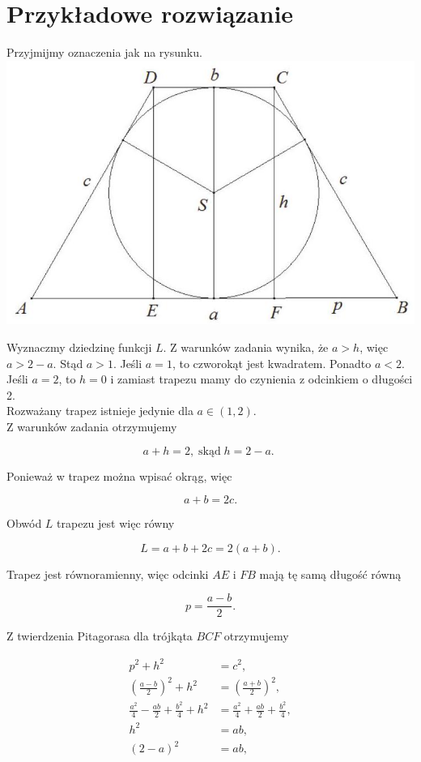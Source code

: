 \documentclass[10pt]{article}
\begin{document}
\section*{Przykładowe rozwiązanie}
Przyjmijmy oznaczenia jak na rysunku.\\
\includegraphics[max width=\textwidth, center]{2025_02_07_a13180f11f288af0ed0dg-31}

Wyznaczmy dziedzinę funkcji $L$. Z warunków zadania wynika, że $a>h$, więc $a>2-a$. Stąd $a>1$. Jeśli $a=1$, to czworokąt jest kwadratem. Ponadto $a<2$. Jeśli $a=2$, to $h=0$ i zamiast trapezu mamy do czynienia z odcinkiem o długości 2.\\
Rozważany trapez istnieje jedynie dla $a \in(1,2)$.\\
Z warunków zadania otrzymujemy

$$
a+h=2, \operatorname{skąd} h=2-a \text {. }
$$

Ponieważ w trapez można wpisać okrąg, więc

$$
a+b=2 c .
$$

Obwód $L$ trapezu jest więc równy

$$
L=a+b+2 c=2(a+b) .
$$

Trapez jest równoramienny, więc odcinki $A E$ i $F B$ mają tę samą długość równą

$$
p=\frac{a-b}{2} .
$$

Z twierdzenia Pitagorasa dla trójkąta $B C F$ otrzymujemy

$$
\begin{aligned}
p^{2}+h^{2} & =c^{2}, \\
\left(\frac{a-b}{2}\right)^{2}+h^{2} & =\left(\frac{a+b}{2}\right)^{2}, \\
\frac{a^{2}}{4}-\frac{a b}{2}+\frac{b^{2}}{4}+h^{2} & =\frac{a^{2}}{4}+\frac{a b}{2}+\frac{b^{2}}{4}, \\
h^{2} & =a b, \\
(2-a)^{2} & =a b,
\end{aligned}
$$
\end{document}
